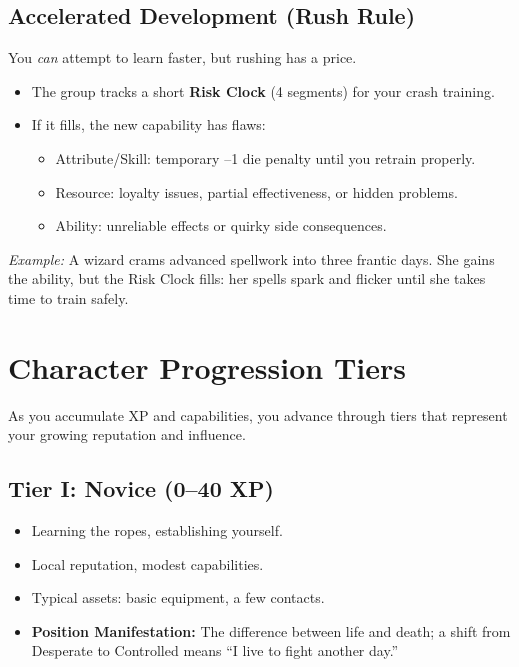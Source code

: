 \subsection{Accelerated Development (Rush Rule)}
\label{sec:rush-rule}
You \emph{can} attempt to learn faster, but rushing has a price.
\begin{itemize}
  \item The group tracks a short \textbf{Risk Clock} (4 segments) for your crash training.
  \item If it fills, the new capability has flaws:
    \begin{itemize}
      \item Attribute/Skill: temporary –1 die penalty until you retrain properly.
      \item Resource: loyalty issues, partial effectiveness, or hidden problems.
      \item Ability: unreliable effects or quirky side consequences.
    \end{itemize}
\end{itemize}
\noindent\textit{Example:} A wizard crams advanced spellwork into three frantic days.
She gains the ability, but the Risk Clock fills: her spells spark and flicker
until she takes time to train safely.

\newpage
\section{Character Progression Tiers}
\label{sec:tiers}

As you accumulate XP and capabilities, you advance through tiers that represent your growing reputation and influence.

\subsection{Tier I: Novice (0–40 XP)}
\label{sec:tier-i}
\begin{itemize}
\item Learning the ropes, establishing yourself.
\item Local reputation, modest capabilities.
\item Typical assets: basic equipment, a few contacts.
\item \textbf{Position Manifestation:} The difference between life and death; a shift from Desperate to Controlled means “I live to fight another day.”
\end{itemize}


